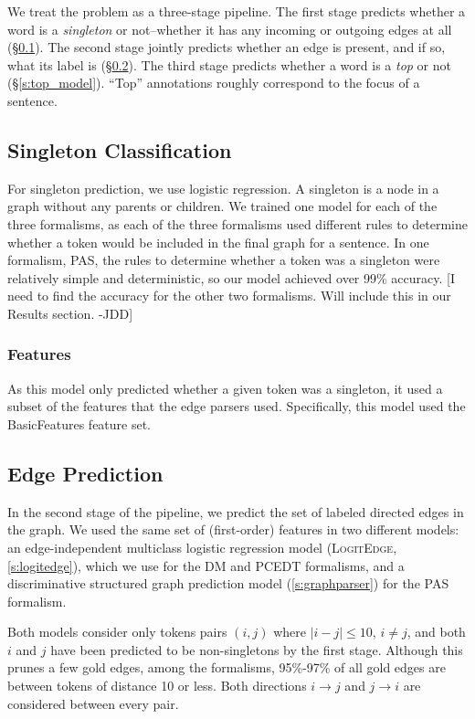 \documentclass[11pt]{article}
\newcommand{\jdcomment}[1]{\textcolor{NavyBlue}{[#1 -JDD]}}
\newcommand{\logitedge}{\textsc{LogitEdge}}
\begin{document}
We treat the problem as a three-stage pipeline.
The first stage predicts whether a word is a \emph{singleton} or not--whether it
has any incoming or outgoing edges at all (\S\ref{s:singleton_model}).
The second stage jointly predicts whether an edge is present, and if so, what
its label is (\S\ref{s:edge_model}).
The third stage predicts whether a word is a \emph{top} or not
(\S\ref{s:top_model}).
``Top'' annotations roughly correspond to the focus of a
sentence.


\subsection{Singleton Classification} \label{s:singleton_model}

For singleton prediction, we use logistic regression.
A singleton is a node in a graph without any parents or children.
We trained one model for each of the three formalisms, as each of the three
formalisms used different rules to determine whether a token would be included
in the final graph for a sentence.
In one formalism, PAS, the rules to determine whether a token was a singleton
were relatively simple and deterministic, so our model achieved over 99\%
accuracy.
\jdcomment{I need to find the accuracy for the other two formalisms. Will
include this in our Results section.}

\subsubsection{Features}
As this model only predicted whether a given token was a singleton, it used a
subset of the features that the edge parsers used.
Specifically, this model used the BasicFeatures feature set.


\subsection{Edge Prediction} \label{s:edge_model}

In the second stage of the pipeline, we predict the set of labeled directed
edges in the graph.
We used the same set of (first-order) features
in two different models: an edge-independent multiclass %
logistic regression model (\logitedge, \ref{s:logitedge}), which we use for the
DM and PCEDT formalisms, and a discriminative structured graph prediction model
(\ref{s:graphparser}) for the PAS formalism.

Both models consider only tokens pairs $(i, j)$ where %
$|i-j| \leq 10$, $i \ne j$, and both $i$ and
$j$ have been predicted to be non-singletons by the first stage.
Although this prunes a few gold edges, among the formalisms, 95\%-97\% of all
gold edges are between tokens of distance 10 or less.
Both directions $i \rightarrow j$ and $j \rightarrow i$ are considered between
every pair.
\end{document}
